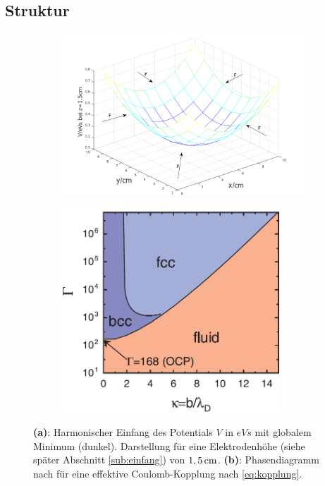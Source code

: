 \documentclass[numbers=noenddot,a4paper,notitlepage,twoside,BCOR15mm]{scrbook}
\newcommand{\fett}[1]{\textbf{#1}}
\begin{document}
				 \subsection{Struktur}

						 \begin{figure}[!t]
						 	\centering
						 	\begin{subfigure}[t]{0.48\textwidth}
						 		\centering
						 		\includegraphics[width=1.1\textwidth,height=0.3\textheight]{figs/einfangpotnu.png}
						 		\caption{}
						 		\label{img:potential}
						 	\end{subfigure}
						 	\begin{subfigure}[t]{0.48\textwidth}
						 		\centering
						 		\includegraphics[width=0.9\textwidth,height=0.3\textheight]{figs/gammaphasetransmelzer.png}
						 		\caption{}
						 		\label{img:gamma}
						 	\end{subfigure}
						 	\caption{\fett{(a)}: Harmonischer Einfang des Potentials $V$ in $\unit{eVs}$ mit globalem Minimum (dunkel). Darstellung für eine Elektrodenhöhe (siehe später Abschnitt \ref{sub:einfang}) von $\unit[1,5]{cm}$. \fett{(b)}: Phasendiagramm nach \cite{Melzer12} für eine effektive Coulomb-Kopplung nach \autoref{eq:kopplung}.}
						 \end{figure}
\end{document}
